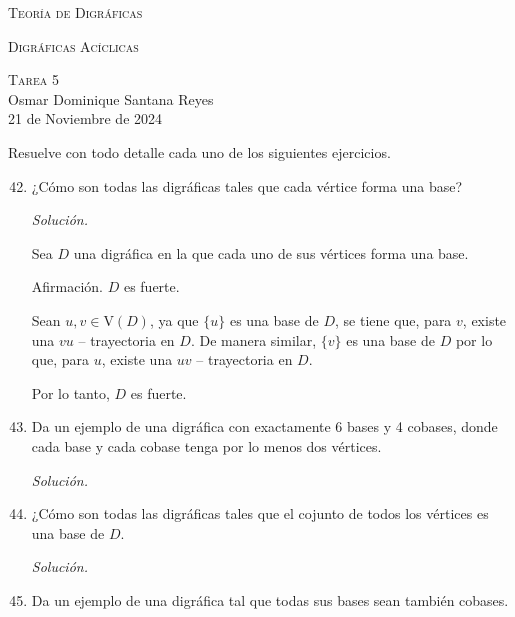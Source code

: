 \documentclass[12pt, fleqn]{article}
\newcommand{\V}[1]{\mathrm{V} \! \left( #1 \right)}
\newcommand{\tray}[2]{$ #1 #2 $ -- trayectoria}
\begin{document}
	\begin{center}
		{\huge \textsc{Teoría de Digráficas}}
	
		{\Large \textsc{Digráficas Acíclicas}}
	
		{\Large \textsc{Tarea 5}} \\
		Osmar Dominique Santana Reyes \\
		21 de Noviembre de 2024
	\end{center} \vspace{3mm}

	Resuelve con todo detalle cada uno de los siguientes ejercicios.

	\begin{enumerate}
		\setcounter{enumi}{41}
		\item ¿Cómo son todas las digráficas tales que cada vértice forma una base?
		
		\emph{Solución.}

		Sea $D$ una digráfica en la que cada uno de sus vértices forma una base.

		Afirmación. $D$ es fuerte.

		Sean $ u,v \in \V{D} $, ya que $ \lbrace u \rbrace $ es una base de $D$, se tiene que, para $v$, existe una \tray{v}{u} en $D$. De manera similar, $ \lbrace v \rbrace $ es una base de $D$ por lo que, para $u$, existe una \tray{u}{v} en $D$.

		Por lo tanto, $D$ es fuerte. 
		
		\item Da un ejemplo de una digráfica con exactamente 6 bases y 4 cobases, donde cada base y cada cobase tenga por lo menos dos vértices.
		
		\emph{Solución.}

		
		
		\item ¿Cómo son todas las digráficas tales que el cojunto de todos los vértices es una base de $D$.
		
		\emph{Solución.}

		
		
		\item Da un ejemplo de una digráfica tal que todas sus bases sean también cobases.
		

\end{enumerate}
\end{document}
